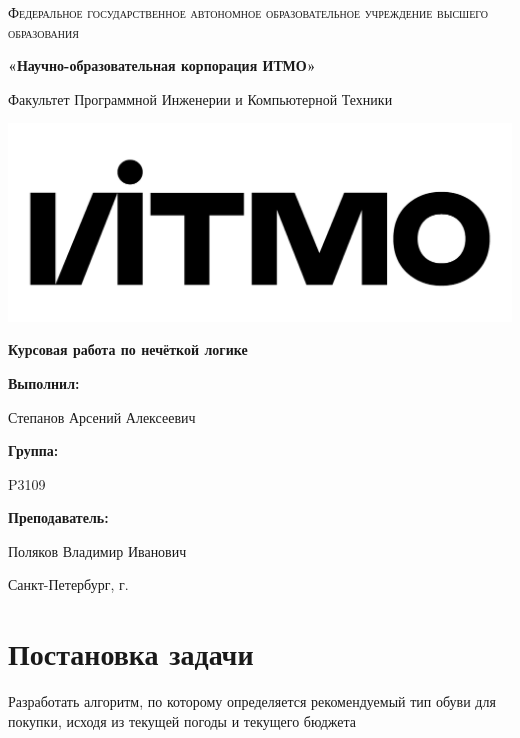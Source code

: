 \documentclass[12pt,a4paper]{report}
\begin{document}
\begin{titlepage} 
	\centering
	{
        \scshape
        Федеральное государственное автономное образовательное учреждение высшего образования
        \par
        \textbf{«Научно-образовательная корпорация ИТМО»}
        \par
        \vspace*{1cm}
        Факультет Программной Инженерии и Компьютерной Техники
        \par
    }
    \vspace*{0.6cm}
    \includegraphics[width=\textwidth]{logo.png}
    {
        \Large
        \textbf{Курсовая работа по нечёткой логике}
        \par
        \normalsize
        \vspace*{0.75cm}
        \textbf{}
        \par
    }
    \vfill
    \hfill\begin{minipage}{\dimexpr\textwidth-7.8cm}
        \textbf{Выполнил:}\par
        Степанов Арсений Алексеевич\par
        \vspace*{0.15cm}
        \textbf{Группа:}\par
        P3109\par
        \vspace*{0.15cm}
        \textbf{Преподаватель:}\par
        Поляков Владимир Иванович\par
    \end{minipage}
    \vfill
    Санкт-Петербург, \the\year{}г.
\end{titlepage}   
\onehalfspacing
\section*{Постановка задачи}
Разработать алгоритм, по которому определяется рекомендуемый тип обуви для покупки, исходя из текущей погоды и текущего бюджета
\end{document}
